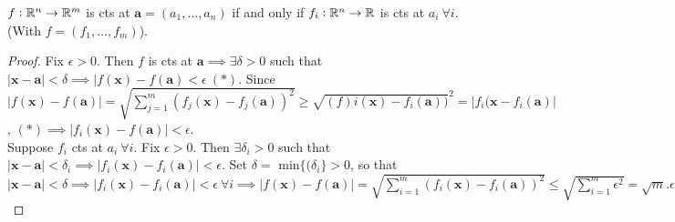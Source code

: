 \begin{theorem}
	$f:\mathbb{R}^n \to \mathbb{R}^m$ is cts at $\mathbf{a} = (a_1,\dots,a_n)$ if and only if $f_i:\mathbb{R}^n \to \mathbb{R}$ is cts at $a_i~\forall i$. (With $f = (f_1,\dots,f_m)$).
\end{theorem}
\begin{proof}
	Fix $\epsilon >0.$ Then $f$ is cts at $\mathbf{a} \implies \exists \delta >0 $ such that $|\mathbf{x} - \mathbf{a}| < \delta  \implies |f(\mathbf{x}) - f(\mathbf{a}) < \epsilon ~(*)$. Since $|f(\mathbf{x}) - f(\mathbf{a})| = \sqrt{\sum_{j=1}^m (f_j(\mathbf{x}) - f_j(\mathbf{a}))^2} \geq \sqrt{(f)i(\mathbf{x}) - f_i(\mathbf{a}))}^2 = |f_i(\mathbf{x} - f_i(\mathbf{a})|$, $(*) \implies |f_i(\mathbf{x}) - f(\mathbf{a})| < \epsilon$.\\
	
	Suppose $f_i$ cts at $a_i~\forall i$. Fix $\epsilon > 0$. Then $\exists \delta_i > 0$ such that $|\mathbf{x} - \mathbf{a}| < \delta_i \implies |f_i(\mathbf{x}) - f_i(\mathbf{a})| < \epsilon$. Set $\delta =$ min$\{(\delta_i\} >0$, so that $|\mathbf{x} - \mathbf{a}| < \delta \implies |f_i(\mathbf{x}) - f_i(\mathbf{a})| < \epsilon ~\forall i \implies |f(\mathbf{x}) - f(\mathbf{a})| = \sqrt{\sum_{i=1}^m (f_i(\mathbf{x}) - f_i(\mathbf{a}))^2} \leq \sqrt{\sum_{i=1}^m \epsilon^2} = \sqrt{m}.\epsilon$
\end{proof}



